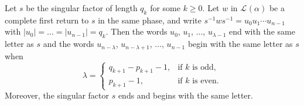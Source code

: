 \documentclass[a4paper,fleqn]{article}
\providecommand{\abs}[1]{\lvert#1\rvert}
\newcommand{\Lang}[2][]{\mathcal{L}_{#1}(#2)}
\begin{document}
  \begin{lemma}\label{lem:first_last_letter}
    Let $s$ be the singular factor of length $q_k$ for some $k \geq 0$. Let $w$ in $\Lang{\alpha}$ be a complete first
    return to $s$ in the same phase, and write $s^{-1}ws^{-1} = u_0 u_1 \cdots u_{n - 1}$ with
    $\abs{u_0} = \ldots = \abs{u_{n - 1}} = q_k$. Then the words $u_0$, $u_1$, $\ldots$, $u_{\lambda-1}$ end with the
    same letter as $s$ and the words $u_{n - \lambda}$, $u_{n - \lambda + 1}$, $\ldots$, $u_{n - 1}$ begin with the
    same letter as $s$ when
    \begin{equation*}
      \lambda = \begin{cases}
                  q_{k+1} - p_{k+1} - 1, &\text{if $k$ is odd}, \\
                  p_{k+1} - 1,           &\text{if $k$ is even}.
                \end{cases}
    \end{equation*}
    Moreover, the singular factor $s$ ends and begins with the same letter.
  \end{lemma}
\end{document}
